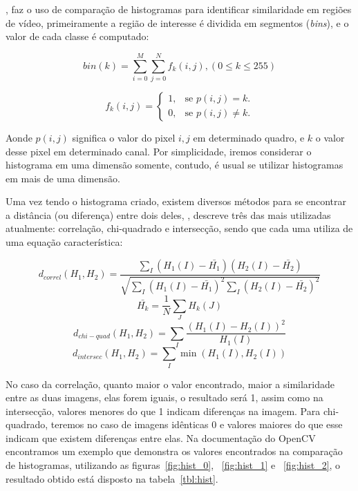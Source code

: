 \documentclass[ecp,tc]{iiufrgs}
\begin{document}
, faz o uso de comparação de histogramas para identificar similaridade em regiões de vídeo, primeiramente a região de interesse é dividida em segmentos (\textit{bins}), e o valor de cada classe é computado:

\[
bin(k) = \sum_{i=0}^{M}\sum_{j=0}^{N}f_k(i,j),(0 \le k \le 255)
\]

\begin{equation}
f_k(i,j)=\begin{cases}
1, & \text{se $p(i,j) = k$}.\\
0, & \text{se $p(i,j) \neq k$}.
\end{cases}
\end{equation}

Aonde $ p(i,j) $ significa o valor do pixel $ i, j$ em determinado quadro, e $ k $ o valor desse pixel em determinado canal. Por simplicidade, iremos considerar o histograma em uma dimensão somente, contudo, é usual se utilizar histogramas em mais de uma dimensão.

Uma vez tendo o histograma criado, existem diversos métodos para se encontrar a distância (ou diferença) entre dois deles, , descreve três das mais utilizadas atualmente: correlação, chi-quadrado e intersecção, sendo que cada uma utiliza de uma equação característica:

\[
d_{correl}(H_1,H_2) =  \frac{\sum_I (H_1(I) - \bar{H_1}) (H_2(I) - \bar{H_2})}{\sqrt{\sum_I(H_1(I) - \bar{H_1})^2 \sum_I(H_2(I) - \bar{H_2})^2}}
\]
\[
\bar{H_k} =  \frac{1}{N} \sum _J H_k(J)
\]
\[
d_{chi-quad}(H_1,H_2) =  \sum _I  \frac{\left(H_1(I)-H_2(I)\right)^2}{H_1(I)}
\]
\[
d_{intersec}(H_1,H_2) =  \sum _I  \min (H_1(I), H_2(I))
\]

No caso da correlação, quanto maior o valor encontrado, maior a similaridade entre as duas imagens, elas forem iguais, o resultado será 1, assim como na intersecção, valores menores do que 1 indicam diferenças na imagem. Para chi-quadrado, teremos no caso de imagens idênticas 0 e valores maiores do que esse indicam que existem diferenças entre elas. Na documentação do OpenCV encontramos um exemplo que demonstra os valores encontrados na comparação de histogramas, utilizando as figuras~\ref{fig:hist_0}, ~\ref{fig:hist_1} e ~\ref{fig:hist_2}, o resultado obtido está disposto na tabela~\ref{tbl:hist}.
\end{document}
